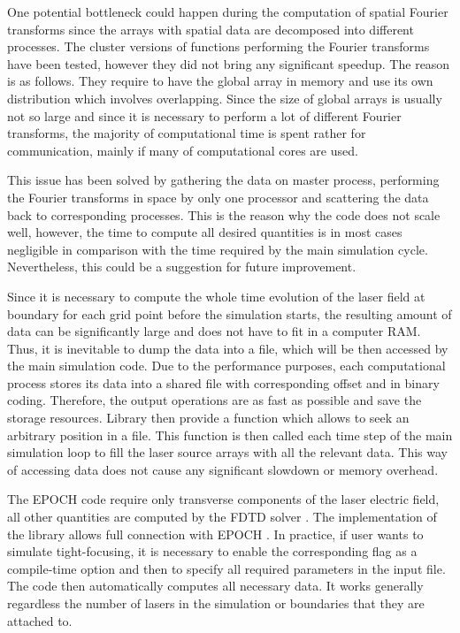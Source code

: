 One potential bottleneck could happen during the computation of spatial Fourier transforms since the arrays with spatial data are decomposed into different processes. The cluster versions of functions performing the Fourier transforms have been tested, however they did not bring any significant speedup. The reason is as follows. They require to have the global array in memory and use its own distribution which involves overlapping. Since the size of global arrays is usually not so large and since it is necessary to perform a lot of different Fourier transforms, the majority of computational time is spent rather for communication, mainly if many of computational cores are used.

This issue has been solved by gathering the data on master process, performing the Fourier transforms in space by only one processor and scattering the data back to corresponding processes. This is the reason why the code does not scale well, however, the time to compute all desired quantities is in most cases negligible in comparison with the time required by the main simulation cycle. Nevertheless, this could be a suggestion for future improvement.

Since it is necessary to compute the whole time evolution of the laser field at boundary for each grid point before the simulation starts, the resulting amount of data can be significantly large and does not have to fit in a computer RAM. Thus, it is inevitable to dump the data into a file, which will be then accessed by the main simulation code. Due to the performance purposes, each computational process stores its data into a shared file with corresponding offset and in binary coding. Therefore, the output operations are as fast as possible and save the storage resources. Library then provide a function which allows to seek an arbitrary position in a file. This function is then called each time step of the main simulation loop to fill the laser source arrays with all the relevant data. This way of accessing data does not cause any significant slowdown or memory overhead.

The EPOCH \cite{bennett} code require only transverse components of the laser electric field, all other quantities are computed by the FDTD solver \cite{ruhl}. The implementation of the library allows full connection with EPOCH \cite{bennett}. In practice, if user wants to simulate tight-focusing, it is necessary to enable the corresponding flag as a compile-time option and then to specify all required parameters in the input file. The code then automatically computes all necessary data. It works generally regardless the number of lasers in the simulation or boundaries that they are attached to.


